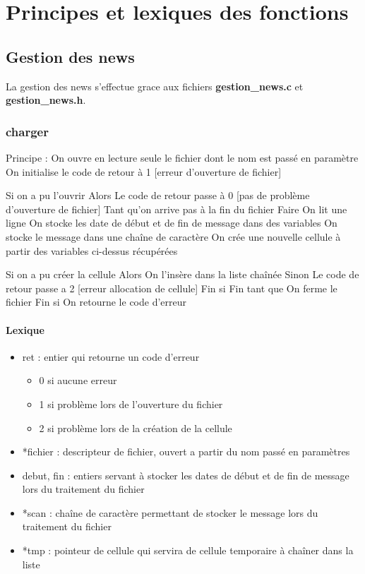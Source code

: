 \documentclass{report}
\begin{document}
 \chapter{Principes et lexiques des fonctions}
    \section{Gestion des news}
      La gestion des news s'effectue grace aux fichiers \textbf{gestion\_news.c} et \textbf{gestion\_news.h}.
      
      \subsection{charger}
Principe :
On ouvre en lecture seule le fichier dont le nom est passé en paramètre
On initialise le code de retour à 1 [erreur d'ouverture de fichier]

Si on a pu l'ouvrir Alors
  Le code de retour passe à 0 [pas de problème d'ouverture de fichier]
  Tant qu'on arrive pas à la fin du fichier Faire
    On lit une ligne
    On stocke les date de début et de fin de message dans des variables
    On stocke le message dans une chaîne de caractère
    On crée une nouvelle cellule à partir des variables ci-dessus récupérées
    
    Si on a pu créer la cellule Alors
      On l'insère dans la liste chaînée
    Sinon
      Le code de retour passe a 2 [erreur allocation de cellule]
    Fin si
  Fin tant que
  On ferme le fichier
Fin si
On retourne le code d'erreur

        \subsubsection{Lexique}
          \begin{itemize}
            \item ret : entier qui retourne un code d'erreur
            \begin{itemize}
              \item 0 si aucune erreur
              \item 1 si problème lors de l'ouverture du fichier
              \item 2 si problème lors de la création de la cellule
            \end{itemize}
            \item *fichier : descripteur de fichier, ouvert a partir du nom passé en paramètres
            \item debut, fin : entiers servant à stocker les dates de début et de fin de message lors du traitement du fichier
            \item *scan : chaîne de caractère permettant de stocker le message lors du traitement du fichier
            \item *tmp : pointeur de cellule qui servira de cellule temporaire à chaîner dans la liste
          \end{itemize}
      
\end{document}
